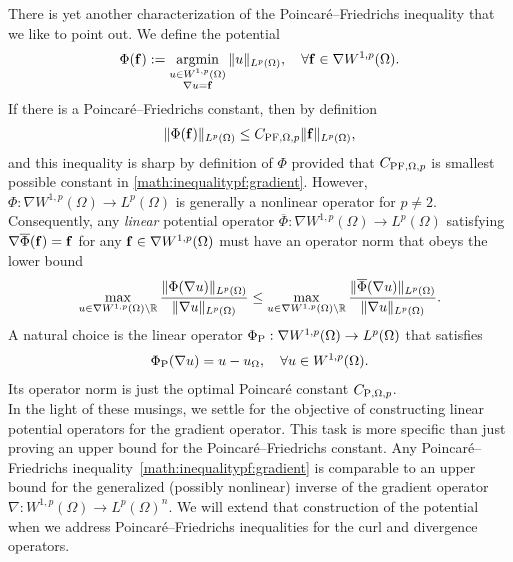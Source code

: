\documentclass[10pt,letterpaper]{article}
\begin{document}
There is yet another characterization of the Poincar\'e--Friedrichs inequality that we like to point out. 
We define the potential 
\begin{align*}
    \Phi( {\mathbf f} ) := \operatorname*{{\rm argmin}}\limits_{ \substack{ u \in W^{1,p}(\Omega) \\ \nabla u = {\mathbf f} } } \| u \|_{L^{p}(\Omega)},
    \quad 
    \forall 
    {\mathbf f} \in \nabla W^{1,p}(\Omega)
    .
\end{align*}
If there is a Poincar\'e--Friedrichs constant, then by definition
\begin{align*}
    \| \Phi({\mathbf f}) \|_{L^{p}(\Omega)} \leq C_{{\rm PF},\Omega,p} \| {\mathbf f} \|_{L^{p}(\Omega)},
\end{align*}
and this inequality is sharp by definition of $\Phi$ provided that $C_{{\rm PF},\Omega,p}$ is smallest possible constant in \eqref{math:inequalitypf:gradient}. 
However, $\Phi : \nabla W^{1,p}(\Omega) \rightarrow L^{p}(\Omega)$ is generally a nonlinear operator for $p \neq 2$. 
Consequently, any \textit{linear} potential operator $\overline\Phi : \nabla W^{1,p}(\Omega) \rightarrow L^{p}(\Omega)$
satisfying $\nabla \overline\Phi( {\mathbf f} ) = {\mathbf f}$ for any ${\mathbf f} \in \nabla W^{1,p}(\Omega)$ must have an operator norm that obeys the lower bound 
\begin{align*}
    \max\limits_{ u \in \nabla W^{1,p}(\Omega) \setminus {\mathbb R} } 
    \frac{ \| \Phi(\nabla u) \|_{L^{p}(\Omega)} }{ \| \nabla u \|_{L^{p}(\Omega)} }
    \leq 
    \max\limits_{ u \in \nabla W^{1,p}(\Omega) \setminus {\mathbb R} } 
    \frac{ \| \overline\Phi(\nabla u) \|_{L^{p}(\Omega)} }{ \| \nabla u \|_{L^{p}(\Omega)} }
    .
\end{align*}
A natural choice is the linear operator $\Phi_{{\rm P}} : \nabla W^{1,p}(\Omega) \rightarrow L^{p}(\Omega)$ that satisfies 
\begin{align*}
    \Phi_{{\rm P}}( \nabla u ) = u - u_{\Omega},
    \quad 
    \forall 
    u \in W^{1,p}(\Omega)
    .
\end{align*}
Its operator norm is just the optimal Poincar\'e constant $C_{{\rm P},\Omega,p}$.
\\

In the light of these musings, we settle for the objective of constructing linear potential operators for the gradient operator.
This task is more specific than just proving an upper bound for the Poincar\'e--Friedrichs constant. 
Any Poincar\'e--Friedrichs inequality~\eqref{math:inequalitypf:gradient} is comparable to an upper bound for the generalized (possibly nonlinear) inverse of the gradient operator $\nabla : W^{1,p}(\Omega) \rightarrow L^{p}(\Omega)^{n}$. 
We will extend that construction of the potential when we address Poincar\'e--Friedrichs inequalities for the curl and divergence operators. 
\end{document}
